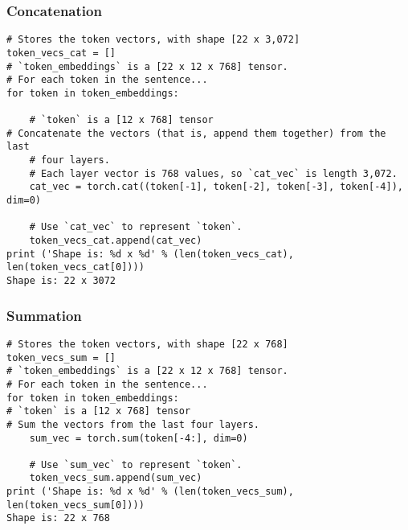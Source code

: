 \begin{frame}[fragile]\frametitle{Concatenation}


\begin{lstlisting}
# Stores the token vectors, with shape [22 x 3,072]
token_vecs_cat = []
# `token_embeddings` is a [22 x 12 x 768] tensor.
# For each token in the sentence...
for token in token_embeddings:
    
    # `token` is a [12 x 768] tensor
# Concatenate the vectors (that is, append them together) from the last 
    # four layers.
    # Each layer vector is 768 values, so `cat_vec` is length 3,072.
    cat_vec = torch.cat((token[-1], token[-2], token[-3], token[-4]), dim=0)
    
    # Use `cat_vec` to represent `token`.
    token_vecs_cat.append(cat_vec)
print ('Shape is: %d x %d' % (len(token_vecs_cat), len(token_vecs_cat[0])))
Shape is: 22 x 3072
\end{lstlisting}

\end{frame}

\begin{frame}[fragile]\frametitle{Summation}


\begin{lstlisting}
# Stores the token vectors, with shape [22 x 768]
token_vecs_sum = []
# `token_embeddings` is a [22 x 12 x 768] tensor.
# For each token in the sentence...
for token in token_embeddings:
# `token` is a [12 x 768] tensor
# Sum the vectors from the last four layers.
    sum_vec = torch.sum(token[-4:], dim=0)
    
    # Use `sum_vec` to represent `token`.
    token_vecs_sum.append(sum_vec)
print ('Shape is: %d x %d' % (len(token_vecs_sum), len(token_vecs_sum[0])))
Shape is: 22 x 768
\end{lstlisting}

\end{frame}

